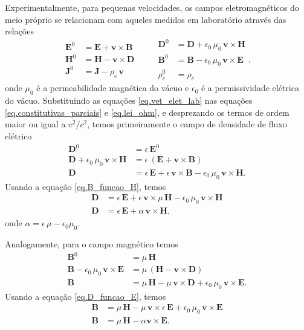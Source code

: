 Experimentalmente, para pequenas velocidades, os campos eletromagn\'eticos do meio pr\'oprio se relacionam com aqueles medidos em laborat\'orio atrav\'es das rela\c{c}\~oes 
\begin{equation}\label{eq.vet_elet_lab}
\begin{aligned}
\mathbf{E}^0&=\mathbf{E}+\mathbf{v}\times\mathbf{B}\\
\mathbf{H}^0&=\mathbf{H}-\mathbf{v}\times\mathbf{D}\\
\mathbf{J}^0&=\mathbf{J}-\rho_e\,\mathbf{v}
\end{aligned}
\qquad
\begin{aligned}
\mathbf{D}^0&=\mathbf{D}+\epsilon_0\,\mu_0\,\mathbf{v}\times\mathbf{H}\\
\mathbf{B}^0&=\mathbf{B}-\epsilon_0\,\mu_0\,\mathbf{v}\times\mathbf{E}\\
\rho_e^0&=\rho_e
\end{aligned},
\end{equation}
onde $\mu_0$ \'e a permeabilidade magn\'etica do v\'acuo e $\epsilon_0$ \'e a permissividade el\'etrica do v\'acuo. Substituindo as equa\c{c}\~oes \ref{eq.vet_elet_lab} nas equa\c{c}\~oes \ref{eq.constitutivas_parciais} e \ref{eq.lei_ohm}, e desprezando os termos de ordem maior ou igual a $v^2/c^2$, temos primeiramente o campo de densidade de fluxo el\'etrico
\begin{align*}
\mathbf{D}^0&=\epsilon\,\mathbf{E}^0\\
\mathbf{D}+\epsilon_0\,\mu_0\,\mathbf{v}\times\mathbf{H}&=\epsilon\,(\mathbf{E}+\mathbf{v}\times\mathbf{B})\\
\mathbf{D}&=\epsilon\,\mathbf{E}+\epsilon\,\mathbf{v}\times\mathbf{B}-\epsilon_0\,\mu_0\,\mathbf{v}\times\mathbf{H}.
\end{align*}
Usando a equa\c{c}\~ao \ref{eq.B_funcao_H}, temos
\begin{align}\label{eq.constitutiva_1}\nonumber
\mathbf{D}&=\epsilon\,\mathbf{E}+\epsilon\,\mathbf{v}\times\mu\,\mathbf{H}-\epsilon_0\,\mu_0\,\mathbf{v}\times\mathbf{H}\\
\mathbf{D}&=\epsilon\,\mathbf{E}+\alpha\,\mathbf{v}\times\mathbf{H},
\end{align}
onde $\alpha=\epsilon\,\mu-\epsilon_0\mu_0$.

Analogamente, para o campo magn\'etico temos
\begin{align*}
\mathbf{B}^0&=\mu\,\mathbf{H}\\
\mathbf{B}-\epsilon_0\,\mu_0\,\mathbf{v}\times\mathbf{E}&=\mu\,(\mathbf{H}-\mathbf{v}\times\mathbf{D})\\
\mathbf{B}&=\mu\,\mathbf{H}-\mu\,\mathbf{v}\times\mathbf{D}+\epsilon_0\,\mu_0\,\mathbf{v}\times\mathbf{E}.
\end{align*}
Usando a equa\c{c}\~ao \ref{eq.D_funcao_E}, temos
\begin{align}\label{eq.constitutiva_2}\nonumber
\mathbf{B}&=\mu\,\mathbf{H}-\mu\,\mathbf{v}\times\epsilon\,\mathbf{E}+\epsilon_0\,\mu_0\,\mathbf{v}\times\mathbf{E}\\
\mathbf{B}&=\mu\,\mathbf{H}-\alpha\mathbf{v}\times\mathbf{E}.
\end{align}

